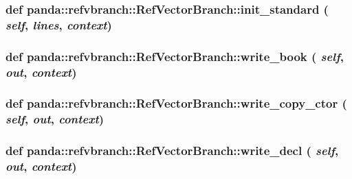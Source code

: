 \label{classpanda_1_1refvbranch_1_1RefVectorBranch_a0552ee354e3a369c54081332ec0d82c2}
\hypertarget{classpanda_1_1refvbranch_1_1RefVectorBranch_acd2b5cd29c687745c44b5be9dd724f72}{
\subsubsection[{init\_\-standard}]{\setlength{\rightskip}{0pt plus 5cm}def panda::refvbranch::RefVectorBranch::init\_\-standard ( {\em self}, \/   {\em lines}, \/   {\em context})}}
\label{classpanda_1_1refvbranch_1_1RefVectorBranch_acd2b5cd29c687745c44b5be9dd724f72}
\hypertarget{classpanda_1_1refvbranch_1_1RefVectorBranch_aaa050ccde603b9c6e1486ab1cabf2586}{
\subsubsection[{write\_\-book}]{\setlength{\rightskip}{0pt plus 5cm}def panda::refvbranch::RefVectorBranch::write\_\-book ( {\em self}, \/   {\em out}, \/   {\em context})}}
\label{classpanda_1_1refvbranch_1_1RefVectorBranch_aaa050ccde603b9c6e1486ab1cabf2586}
\hypertarget{classpanda_1_1refvbranch_1_1RefVectorBranch_ac778068a381fc7125457161cbc612be4}{
\subsubsection[{write\_\-copy\_\-ctor}]{\setlength{\rightskip}{0pt plus 5cm}def panda::refvbranch::RefVectorBranch::write\_\-copy\_\-ctor ( {\em self}, \/   {\em out}, \/   {\em context})}}
\label{classpanda_1_1refvbranch_1_1RefVectorBranch_ac778068a381fc7125457161cbc612be4}
\hypertarget{classpanda_1_1refvbranch_1_1RefVectorBranch_a8d1f936c35c293b5b0b8d1fdf19b4594}{
\subsubsection[{write\_\-decl}]{\setlength{\rightskip}{0pt plus 5cm}def panda::refvbranch::RefVectorBranch::write\_\-decl ( {\em self}, \/   {\em out}, \/   {\em context})}}
